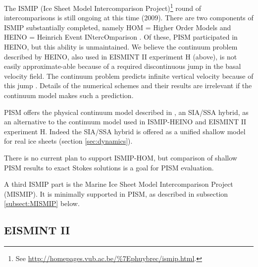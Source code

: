 The ISMIP (Ice Sheet Model Intercomparison Project)\footnote{See \url{http://homepages.vub.ac.be/\%7Ephuybrec/ismip.html}.} round of intercomparisons is still ongoing at this time (2009).  There are two components of ISMIP substantially completed, namely HOM = Higher Order Models \cite{ISMIPHOM,HOMelmer} and HEINO = Heinrich Event INtercOmparison \cite{GreveTakahamaCalov,Calovetal2009HEINOfinal}.  Of these, PISM participated in HEINO, but this ability is unmaintained.   We believe the continuum problem described by HEINO, also used in EISMINT II experiment H (above), is not easily approximate-able because of a required discontinuous jump in the basal velocity field.  The continuum problem predicts infinite vertical velocity because of this jump \cite[Appendix B]{BBssasliding}.  Details of the numerical schemes and their results are irrelevant if the continuum model makes such a prediction.

PISM offers the physical continuum model described in \cite{BBssasliding}, an SIA/SSA hybrid, as an alternative to the continuum model used in ISMIP-HEINO and EISMINT II experiment H.  Indeed the SIA/SSA hybrid is offered as a unified shallow model for real ice sheets (section \ref{sec:dynamics}).

There is no current plan to support ISMIP-HOM, but comparison of shallow PISM results to exact Stokes solutions is a goal for PISM evaluation.

A third ISMIP part is the Marine Ice Sheet Model Intercomparison Project (MISMIP).  It is minimally supported in PISM, as described in subsection \ref{subsect:MISMIP} below.


\subsection{EISMINT II}\label{subsect:EISMINTII}

